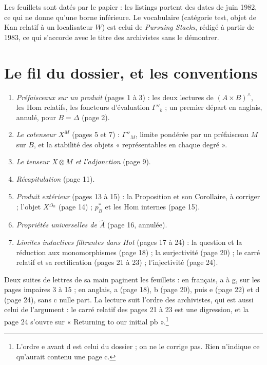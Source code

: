\documentclass[11pt,a4paper]{article}
\begin{document}
\begin{resume}
Les feuillets sont datés par le papier : les listings portent des dates de
juin 1982, ce qui ne donne qu'une borne inférieure. Le vocabulaire
(catégorie test, objet de Kan relatif à un localisateur $\underline{W}$)
est celui de \emph{Pursuing Stacks}, rédigé à partir de 1983, ce qui s'accorde
avec le titre des archivistes sans le démontrer.

\end{resume}

\section*{Le fil du dossier, et les conventions}

\begin{enumerate}
\item[1.] \emph{Préfaisceaux sur un produit} (pages 1 à 3) : les deux lectures
de $(A \times B)^{\wedge}$, les Hom relatifs, les foncteurs d'évaluation
$\Gamma''_{b}$ ; un premier départ en anglais, annulé, pour $B = \Delta$ (page
2).
\item[2.] \emph{Le cotenseur $X^{M}$} (pages 5 et 7) : $\Gamma''_{M}$, limite
pondérée par un préfaisceau $M$ sur $B$, et la stabilité des objets
« représentables en chaque degré ».
\item[3.] \emph{Le tenseur $X \otimes M$ et l'adjonction} (page 9).
\item[4.] \emph{Récapitulation} (page 11).
\item[5.] \emph{Produit extérieur} (pages 13 à 15) : la Proposition et son
Corollaire, à corriger ; l'objet $X^{\dot{\Delta}_{n}}$ (page 14) ;
$p_{B}^{*}$ et les Hom internes (page 15).
\item[6.] \emph{Propriétés universelles de $\widehat{A}$} (page 16, annulée).
\item[7.] \emph{Limites inductives filtrantes dans Hot} (pages 17 à 24) : la
question et la réduction aux monomorphismes (page 18) ; la surjectivité (page
20) ; le carré relatif et sa rectification (pages 21 à 23) ; l'injectivité
(page 24).
\end{enumerate}

Deux suites de lettres de sa main paginent les feuillets : en français,
a à g, sur les pages impaires 3 à 15 ; en anglais, a (page 18), b (page 20),
puis e (page 22) et d (page 24), sans c nulle part. La lecture suit l'ordre des
archivistes, qui est aussi celui de l'argument : le carré relatif des pages 21
à 23 est une digression, et la page 24 s'ouvre sur « Returning to our initial
pb ».\footnote{L'ordre e avant d est celui du dossier ; on ne le corrige pas.
Rien n'indique ce qu'aurait contenu une page c.}
\end{document}
